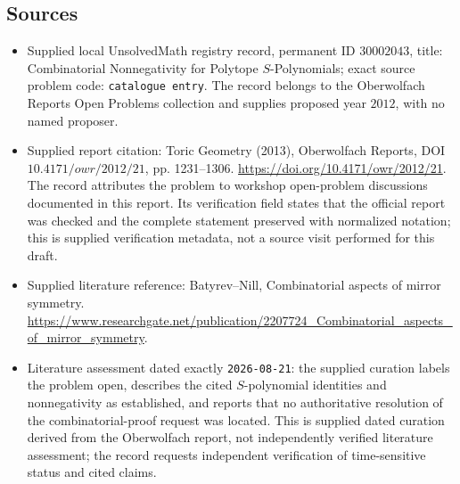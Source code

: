 \documentclass[11pt]{article}
\begin{document}
\subsection{Sources}
\begin{itemize}
\item Supplied local UnsolvedMath registry record, permanent ID \(30002043\), title: Combinatorial Nonnegativity for Polytope \(S\)-Polynomials; exact source problem code: \texttt{catalogue entry}. The record belongs to the Oberwolfach Reports Open Problems collection and supplies proposed year \(2012\), with no named proposer.
\item Supplied report citation: Toric Geometry (2013), Oberwolfach Reports, DOI \(10.4171/owr/2012/21\), pp. 1231--1306. \url{https://doi.org/10.4171/owr/2012/21}. The record attributes the problem to workshop open-problem discussions documented in this report. Its verification field states that the official report was checked and the complete statement preserved with normalized notation; this is supplied verification metadata, not a source visit performed for this draft.
\item Supplied literature reference: Batyrev--Nill, Combinatorial aspects of mirror symmetry. \url{https://www.researchgate.net/publication/2207724_Combinatorial_aspects_of_mirror_symmetry}.
\item Literature assessment dated exactly \texttt{2026-08-21}: the supplied curation labels the problem open, describes the cited \(S\)-polynomial identities and nonnegativity as established, and reports that no authoritative resolution of the combinatorial-proof request was located. This is supplied dated curation derived from the Oberwolfach report, not independently verified literature assessment; the record requests independent verification of time-sensitive status and cited claims.
\end{itemize}
\end{document}
